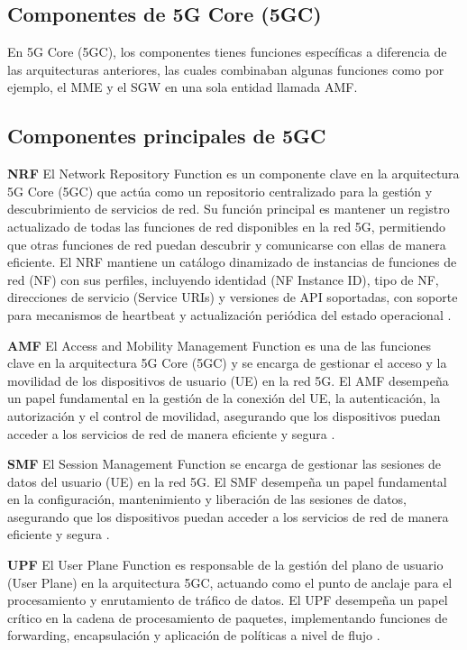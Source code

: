 \subsection{Componentes de 5G Core (5GC)}
En 5G Core (5GC), los componentes tienes funciones específicas a diferencia de las arquitecturas anteriores, las cuales combinaban algunas funciones como por ejemplo, el MME y el SGW en una sola entidad llamada AMF.

\subsection{Componentes principales de 5GC}
\textbf{NRF} El Network Repository Function es un componente clave en la arquitectura 5G Core (5GC) que actúa como un repositorio centralizado para la gestión y descubrimiento de servicios de red. Su función principal es mantener un registro actualizado de todas las funciones de red disponibles en la red 5G, permitiendo que otras funciones de red puedan descubrir y comunicarse con ellas de manera eficiente. El NRF mantiene un catálogo dinamizado de instancias de funciones de red (NF) con sus perfiles, incluyendo identidad (NF Instance ID), tipo de NF, direcciones de servicio (Service URIs) y versiones de API soportadas, con soporte para mecanismos de heartbeat y actualización periódica del estado operacional \cite{3gpp.23.501}.

\textbf{AMF} El Access and Mobility Management Function es una de las funciones clave en la arquitectura 5G Core (5GC) y se encarga de gestionar el acceso y la movilidad de los dispositivos de usuario (UE) en la red 5G. El AMF desempeña un papel fundamental en la gestión de la conexión del UE, la autenticación, la autorización y el control de movilidad, asegurando que los dispositivos puedan acceder a los servicios de red de manera eficiente y segura \cite{3gpp.23.501}.

\textbf{SMF} El Session Management Function se encarga de gestionar las sesiones de datos del usuario (UE) en la red 5G. El SMF desempeña un papel fundamental en la configuración, mantenimiento y liberación de las sesiones de datos, asegurando que los dispositivos puedan acceder a los servicios de red de manera eficiente y segura \cite{3gpp.23.501}.

\textbf{UPF} El User Plane Function es responsable de la gestión del plano de usuario (User Plane) en la arquitectura 5GC, actuando como el punto de anclaje para el procesamiento y enrutamiento de tráfico de datos. El UPF desempeña un papel crítico en la cadena de procesamiento de paquetes, implementando funciones de forwarding, encapsulación y aplicación de políticas a nivel de flujo \cite{3gpp.23.501}.

